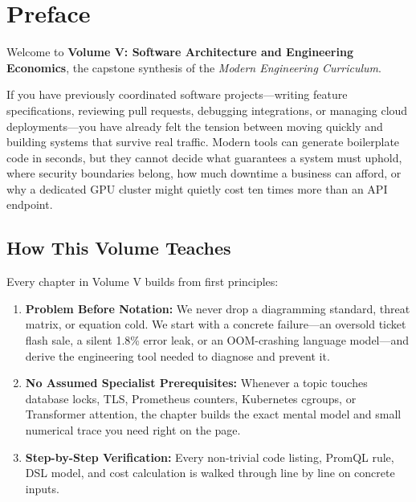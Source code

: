 \documentclass[11pt,oneside]{book}
\begin{document}
\newpage
\pagestyle{fancy}
\tableofcontents

\newpage
\chapter*{Preface}

Welcome to \textbf{Volume V: Software Architecture and Engineering Economics}, the capstone synthesis of the \emph{Modern Engineering Curriculum}.

If you have previously coordinated software projects---writing feature specifications, reviewing pull requests, debugging integrations, or managing cloud deployments---you have already felt the tension between moving quickly and building systems that survive real traffic. Modern tools can generate boilerplate code in seconds, but they cannot decide what guarantees a system must uphold, where security boundaries belong, how much downtime a business can afford, or why a dedicated GPU cluster might quietly cost ten times more than an API endpoint.

\section*{How This Volume Teaches}
Every chapter in Volume V builds from first principles:
\begin{enumerate}[leftmargin=15pt]
  \item \textbf{Problem Before Notation:} We never drop a diagramming standard, threat matrix, or equation cold. We start with a concrete failure---an oversold ticket flash sale, a silent 1.8\% error leak, or an OOM-crashing language model---and derive the engineering tool needed to diagnose and prevent it.
  \item \textbf{No Assumed Specialist Prerequisites:} Whenever a topic touches database locks, TLS, Prometheus counters, Kubernetes cgroups, or Transformer attention, the chapter builds the exact mental model and small numerical trace you need right on the page.
  \item \textbf{Step-by-Step Verification:} Every non-trivial code listing, PromQL rule, DSL model, and cost calculation is walked through line by line on concrete inputs.
\end{enumerate}
\end{document}
